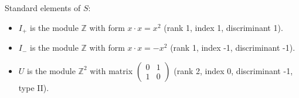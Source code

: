 Standard elements of $S$:
\begin{itemize}
\item $I_+$ is the module $\mathbb{Z}$ with form $x \cdot x = x^2$ (rank 1, index 1, discriminant 1).
\item $I_-$ is the module $\mathbb{Z}$ with form $x \cdot x = -x^2$ (rank 1, index -1, discriminant -1).
\item $U$ is the module $\mathbb{Z}^2$ with matrix $\begin{pmatrix}0&1\\1&0\end{pmatrix}$ (rank 2, index 0, discriminant -1, type II).
\end{itemize}
